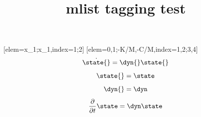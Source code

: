 \documentclass{article}
\title{mlist tagging test}
\begin{document}
\newmatr{}[elem={x_1;\dot x_1},index={1;2}]
\newmatr{}[elem={0,1;-K/M,-C/M},index={1,2;3,4}]
\[ \dot{\state{}} = \dyn{}\state{} \]
\[ \state{} = \state \]
\[ \dyn{} = \dyn \]
\[ \frac\partial{\partial t}
\state = \dyn \state \]
\end{document}
